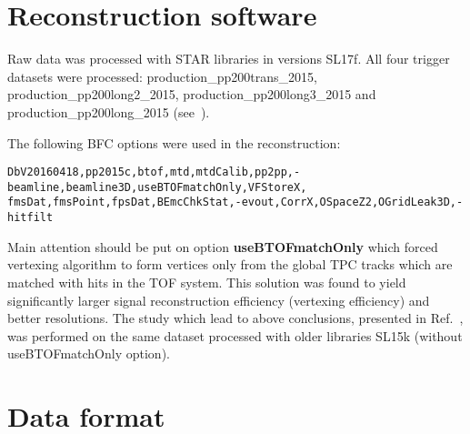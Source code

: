 \section{Reconstruction software}\label{sec:recoSoftware}

Raw data was processed with STAR libraries in versions SL17f. All four trigger datasets were processed: production\_pp200trans\_2015, production\_pp200long2\_2015, production\_pp200long3\_2015 and production\_pp200long\_2015 (see~\cite{ProductionList}).

The following BFC options were used in the reconstruction:\vspace{-5pt}
\begin{verbatim}
DbV20160418,pp2015c,btof,mtd,mtdCalib,pp2pp,-beamline,beamline3D,useBTOFmatchOnly,VFStoreX,
fmsDat,fmsPoint,fpsDat,BEmcChkStat,-evout,CorrX,OSpaceZ2,OGridLeak3D,-hitfilt
\end{verbatim}
Main attention should be put on option \textbf{useBTOFmatchOnly} which forced vertexing algorithm to form vertices only from the global TPC tracks which are matched with hits in the TOF system. This solution was found to yield significantly larger signal reconstruction efficiency (vertexing efficiency) and better resolutions. The study which lead to above conclusions, presented in Ref.~\cite{RevertexingProposal}, was performed on the same dataset processed with older libraries SL15k (without useBTOFmatchOnly option).



\section{Data format}\label{sec:dataFormat}

